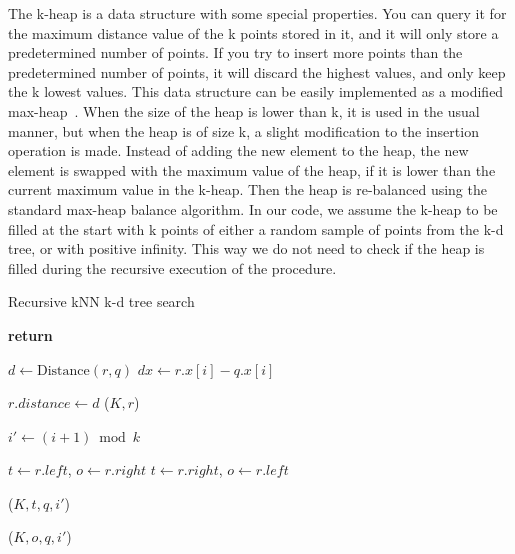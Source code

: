 The k-heap is a data structure with some special properties. You can query it for the maximum distance value of the k points stored in it, and it will only store a predetermined number of points. If you try to insert more points than the predetermined number of points, it will discard the highest values, and only keep the k lowest values. This data structure can be easily implemented as a modified max-heap~\cite[Chapter 6]{Cormen:2001}. When the size of the heap is lower than k, it is used in the usual manner, but when the heap is of size k, a slight modification to the insertion operation is made. Instead of adding the new element to the heap, the new element is swapped with the maximum value of the heap, if it is lower than the current maximum value in the k-heap. Then the heap is re-balanced using the standard max-heap balance algorithm. In our code, we assume the k-heap to be filled at the start with k points of either a random sample of points from the k-d tree, or with positive infinity. This way we do not need to check if the heap is filled during the recursive execution of the procedure.

\begin{algorithm}
\caption{Recursive kNN k-d tree search}
\label{alg:recursive_knn_kd_tree_search}
\begin{algorithmic}
         
            \State \textbf{return}
        \EndIf

        \State $d \gets \text{Distance}(r, q)$
        \State $dx \gets r.x[i] - q.x[i]$

         
            \State $r.distance \gets d$
            \State {}($K, r$)
        \EndIf

        \State $i' \gets (i + 1) \bmod k$ 

          
            \State $t \gets r.left$, $o \gets r.right$
        \Else
            \State $t \gets r.right$, $o \gets r.left$
        \EndIf

        \State {} ($K, t, q, i'$)

         
            \State {}($K, o, q, i'$)
        \EndIf
    \EndProcedure
\end{algorithmic}
\end{algorithm}

